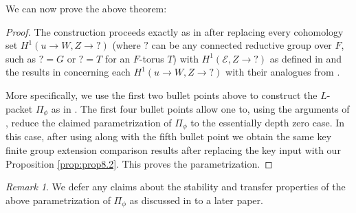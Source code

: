 \documentclass{amsart}
\theoremstyle{definition}
\theoremstyle{remark}
\newtheorem{remark}[result]{Remark}
\begin{document}
We can now prove the above theorem:
\begin{proof}
   The construction proceeds exactly as in \cite{Kal22} after replacing every cohomology set $H^{1}(u \to W, Z \to ?)$ (where $?$ can be any connected reductive group over $F$, such as $?=G$ or $?=T$ for an $F$-torus $T$) with $H^{1}(\mathcal{E}, Z \to ?)$ as defined in \cite{Dillery1} and the results in \cite{kaletha16} concerning each $H^{1}(u \to W, Z \to ?)$ with their analogues from \cite{Dillery1}. 

   More specifically, we use the first two bullet points above to construct the $L$-packet $\Pi_{\phi}$ as in \cite[\S 4.2]{Kal22}. The first four bullet points allow one to, using the arguments of \cite[\S 4.4]{Kal22}, reduce the claimed parametrization of $\Pi_{\phi}$ to the essentially depth zero case. In this case, after using \cite[Corollary 4.5.5, Corollary 4.5.7]{Kal22} along with the fifth bullet point we obtain the same key finite group extension comparison results \cite[Proposition 4.5.1, Lemma 4.5.8]{Kal22} after replacing the key input \cite[Proposition 8.2]{Kal26b} with our Proposition \ref{prop:prop8.2}. This proves the parametrization.
\end{proof}

\begin{remark}
    We defer any claims about the stability and transfer properties of the above parametrization of $\Pi_{\phi}$ as discussed in \cite[\S 4.6]{Kal22} to a later paper.
\end{remark}




\end{document}
